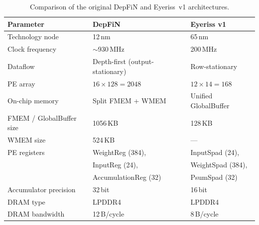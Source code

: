 \begin{table}[htbp]
  \centering
  \caption{Comparison of the original DepFiN and Eyeriss~v1 architectures.}
  \footnotesize
  \setlength{\tabcolsep}{4pt} %
  \renewcommand{\arraystretch}{0.95} %
  \label{tab:orig-arch-comparison}
  \small
  \begin{tabular}{l l l}
    \toprule
    \textbf{Parameter}          & \textbf{DepFiN}                      & \textbf{Eyeriss v1}                 \\
    \midrule
    Technology node              & 12\,nm                               & 65\,nm                              \\
    Clock frequency              & $\sim$930\,MHz                       & 200\,MHz                            \\
    Dataflow                     & Depth-first (output-stationary)      & Row-stationary                      \\
    PE array                     & $16 \times 128 = 2048$               & $12 \times 14 = 168$                \\
    \addlinespace
    On-chip memory               & Split FMEM + WMEM                    & Unified GlobalBuffer                \\
    FMEM / GlobalBuffer size     & 1056\,KB                             & 128\,KB                             \\
    WMEM size                    & 524\,KB                              & ---                                 \\
    \addlinespace
    PE registers                 & WeightReg (384),                     & InputSpad (24),                     \\
                                 & InputReg (24),                       & WeightSpad (384),                   \\
                                 & AccumulationReg (32)                 & PsumSpad (32)                       \\
    Accumulator precision        & 32\,bit                              & 16\,bit                             \\
    \addlinespace
    DRAM type                    & LPDDR4                               & LPDDR4                              \\
    DRAM bandwidth               & 12\,B/cycle                          & 8\,B/cycle                          \\

\end{tabular}
\end{table}
